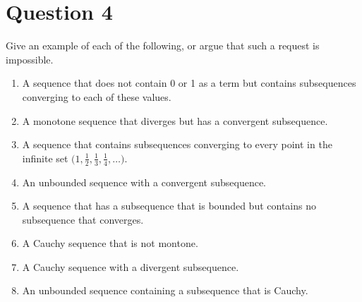 \documentclass[13pt]{article}
\begin{document}
\newpage
\section*{Question 4}
Give an example of each of the following, or argue that such a request
is impossible.
\begin{enumerate}[label=(\alph*)]
\item A sequence that does not contain 0 or 1 as a term but contains subsequences
  converging to each of these values.
\item A monotone sequence that diverges but has a convergent
  subsequence.
\item A sequence that contains subsequences converging to every point
  in the infinite set $\big(1, \frac{1}{2}, \frac{1}{3}, \frac{1}{4},
  \ldots\big)$.
\item An unbounded sequence with a convergent subsequence.
\item A sequence that has a subsequence that is bounded but contains
  no subsequence that converges.
\item A Cauchy sequence that is not montone.
\item A Cauchy sequence with a divergent subsequence.
\item An unbounded sequence containing a subsequence that is Cauchy.
\end{enumerate}
\end{document}
